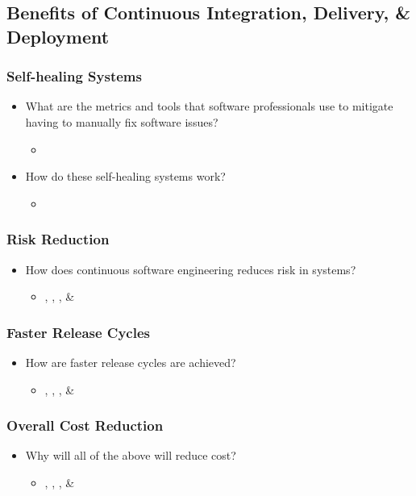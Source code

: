 \documentclass[11pt,a4paper]{article}
\begin{document}
	\subsection{Benefits of Continuous Integration, Delivery, \& Deployment}
		\subsubsection{Self-healing Systems}
		\begin{itemize}[noitemsep]
			\item What are the metrics and tools that software professionals use to mitigate having to manually fix software issues?
			\begin{itemize}
				\item \cite{bosch_2014}
			\end{itemize}
			\item How do these self-healing systems work?
			\begin{itemize}
				\item \cite{bosch_2014}
			\end{itemize}
		\end{itemize}
		\subsubsection{Risk Reduction}
		\begin{itemize}[noitemsep]
			\item How does continuous software engineering reduces risk in systems?
			\begin{itemize}
				\item \cite{atkinson_edwards_2018}, \cite{bosch_2014}, \cite{stackify_2018}, \& \cite{stahl_2017} \cite{stackify_2018}
			\end{itemize}
		\end{itemize}
		\subsubsection{Faster Release Cycles}
		\begin{itemize}[noitemsep]
			\item How are faster release cycles are achieved?
			\begin{itemize}
				\item \cite{atkinson_edwards_2018}, \cite{bosch_2014}, \cite{stackify_2018}, \& \cite{stahl_2017} \cite{stackify_2018}
			\end{itemize}
		\end{itemize}
		\subsubsection{Overall Cost Reduction}
		\begin{itemize}[noitemsep]
			\item Why will all of the above will reduce cost?
			\begin{itemize}
				\item \cite{atkinson_edwards_2018}, \cite{bosch_2014}, \cite{stackify_2018}, \& \cite{stahl_2017} \cite{stackify_2018}
			\end{itemize}
		\end{itemize}
		
\end{document}
